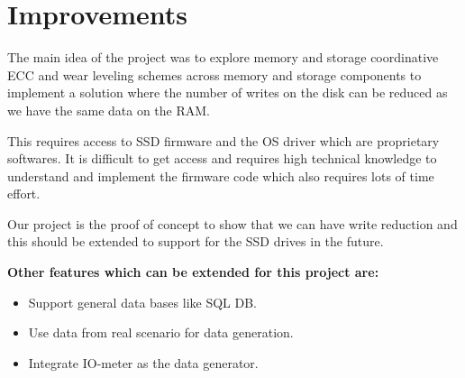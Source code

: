 \chapter{Improvements}
The main idea of the project was to explore memory and storage coordinative ECC and wear leveling schemes across memory and storage components to implement a solution where the number of writes on the disk can be reduced as we have the same data on the RAM. 

This requires access to SSD firmware and the OS driver which are proprietary softwares. It is difficult to get access and requires high technical knowledge to understand and implement the firmware code which also requires lots of time effort. 

Our project is the proof of concept to show that we can have write reduction and this should be extended to support for the SSD drives in the future.

\textbf{Other features which can be extended for this project are:}
\begin{itemize}
    \item Support general data bases like SQL DB.
    \item Use data from real scenario for data generation.
    \item Integrate IO-meter as the data generator. 
\end{itemize}
\newpage